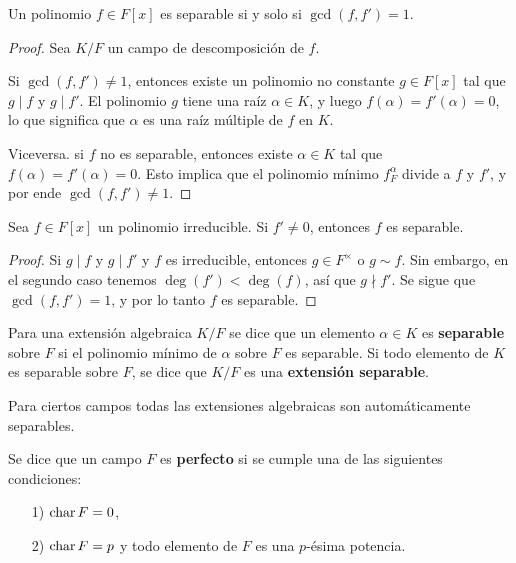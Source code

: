 \begin{corolario}
  Un polinomio $f\in F [x]$ es separable si y solo si $\gcd (f,f') = 1$.

  \begin{proof}
    Sea $K/F$ un campo de descomposición de $f$.
 
    Si $\gcd (f,f') \ne 1$, entonces existe un polinomio no constante
    $g \in F [x]$ tal que $g \mid f$ y $g \mid f'$. El polinomio $g$ tiene una
    raíz $\alpha \in K$, y luego $f (\alpha) = f' (\alpha) = 0$, lo que
    significa que $\alpha$ es una raíz múltiple de $f$ en $K$.

    Viceversa. si $f$ no es separable, entonces existe $\alpha \in K$ tal que
    $f (\alpha) = f' (\alpha) = 0$. Esto implica que el polinomio mínimo
    $f^\alpha_F$ divide a $f$ y $f'$, y por ende $\gcd (f,f') \ne 1$.
  \end{proof}
\end{corolario}

\begin{corolario}
  \label{cor:cuando-irreducible-es-separable}
  Sea $f \in F [x]$ un polinomio irreducible. Si $f' \ne 0$, entonces $f$ es
  separable.

  \begin{proof}
    Si $g \mid f$ y $g \mid f'$ y $f$ es irreducible, entonces $g \in F^\times$
    o $g \sim f$. Sin embargo, en el segundo caso tenemos $\deg (f') < \deg
    (f)$, así que $g \nmid f'$. Se sigue que $\gcd (f,f') = 1$, y por lo tanto
    $f$ es separable.
  \end{proof}
\end{corolario}

\begin{definicion}
  Para una extensión algebraica $K/F$ se dice que un elemento $\alpha \in K$ es
  \textbf{separable} sobre $F$ si el polinomio mínimo de $\alpha$ sobre $F$ es
  separable. Si todo elemento de $K$ es separable sobre $F$, se dice que $K/F$
  es una \textbf{extensión separable}.
\end{definicion}

Para ciertos campos todas las extensiones algebraicas son automáticamente separables.

\begin{definicion}
  Se dice que un campo $F$ es \textbf{perfecto} si se cumple una de las siguientes
  condiciones:
  \begin{enumerate}
  \item[1)] $\operatorname{char} F = 0$,
  \item[2)] $\operatorname{char} F = p$ y todo elemento de $F$ es una $p$-ésima potencia.
  \end{enumerate}
\end{definicion}


